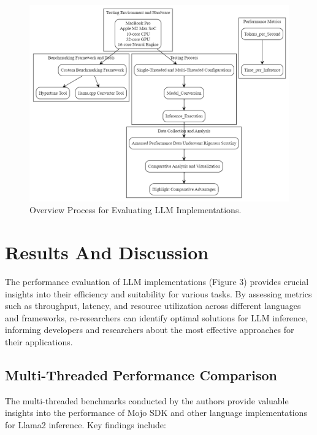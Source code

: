 \documentclass[conference]{IEEEtran}
\begin{document}
\begin{figure}[h]
    \centerline{\includegraphics[width=\linewidth]{fig2.png}}
    \caption{Overview Process for Evaluating LLM Implementations.}
    \label{fig2}
\end{figure}

\section{Results And Discussion}
The performance evaluation of LLM implementations (Figure 3) provides crucial insights into their efficiency and suitability for various tasks. By assessing metrics such as throughput, latency, and resource utilization across different languages and frameworks, re-researchers can identify optimal solutions for LLM inference, informing developers and researchers about the most effective approaches for their applications.

\subsection{Multi-Threaded Performance Comparison}
The multi-threaded benchmarks conducted by the authors provide valuable insights into the performance of Mojo SDK and other language implementations for Llama2 inference. Key findings include:
\end{document}
